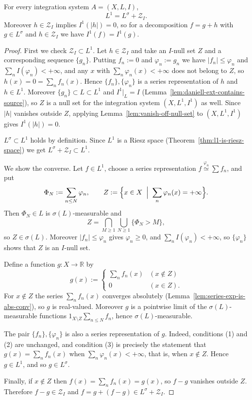 \begin{proposition}\label{prop:l1-decomposition}
  For every integration system $A=(X,L,I)$,
  \[
    L^1=L^{\sigma}+\mathcal{Z}_I .
  \]
  Moreover $h\in\mathcal{Z}_I$ implies $I^1(|h|)=0$, so for a decomposition
  $f=g+h$ with $g\in L^{\sigma}$ and $h\in\mathcal{Z}_I$ we have
  $I^1(f)=I^1(g)$.
\end{proposition}
\begin{proof}
  First we check $\mathcal{Z}_I\subset L^1$.
  Let $h\in\mathcal{Z}_I$ and take an $I$-null set $Z$ and a corresponding
  sequence $\{g_n\}$.
  Putting $f_n:=0$ and $\varphi_n:=g_n$ we have $|f_n|\le\varphi_n$ and
  $\sum_nI(\varphi_n)<+\infty$, and any $x$ with $\sum_n\varphi_n(x)<+\infty$
  does not belong to $Z$, so $h(x)=0=\sum_nf_n(x)$.
  Hence $\{f_n\},\{\varphi_n\}$ is a series representation of $h$ and
  $h\in L^1$.
  Moreover $\{g_n\}\subset L\subset L^1$ and $I^1|_L=I$
  (Lemma~\ref{lem:daniell-ext-contains-source}), so $Z$ is a null set for the
  integration system $(X,L^1,I^1)$ as well.
  Since $|h|$ vanishes outside $Z$, applying
  Lemma~\ref{lem:vanish-off-null-set} to $(X,L^1,I^1)$ gives $I^1(|h|)=0$.

  $L^{\sigma}\subset L^1$ holds by definition. Since $L^1$ is a Riesz space
  (Theorem~\ref{thm:l1-is-riesz-space}) we get
  $L^{\sigma}+\mathcal{Z}_I\subset L^1$.

  We show the converse. Let $f\in L^1$, choose a series representation
  $f\overset{\varphi_n}{\simeq}\sum f_n$, and put
  \[
    \Phi_N:=\sum_{n\le N}\varphi_n,
    \qquad
    Z:=\Bigl\{x\in X\;\Bigm|\;\sum_n\varphi_n(x)=+\infty\Bigr\} .
  \]
  Then $\Phi_N\in L$ is $\sigma(L)$-measurable and
  \[
    Z=\bigcap_{M\ge1}\bigcup_{N\ge1}\{\Phi_N>M\} ,
  \]
  so $Z\in\sigma(L)$.
  Moreover $|f_n|\le\varphi_n$ gives $\varphi_n\ge0$, and
  $\sum_nI(\varphi_n)<+\infty$, so $\{\varphi_n\}$ shows that $Z$ is an $I$-null
  set.

  Define a function $g:X\to\mathbb{R}$ by
  \[
    g(x):=
    \begin{cases}
      \sum_nf_n(x) & (x\notin Z)\\
      0 & (x\in Z).
    \end{cases}
  \]
  For $x\notin Z$ the series $\sum_nf_n(x)$ converges absolutely
  (Lemma~\ref{lem:series-exp-is-abs-conv}), so $g$ is real-valued.
  Moreover $g$ is a pointwise limit of the $\sigma(L)$-measurable functions
  $1_{X\setminus Z}\sum_{n\le N}f_n$, hence $\sigma(L)$-measurable.

  The pair $\{f_n\},\{\varphi_n\}$ is also a series representation of $g$.
  Indeed, conditions (1) and (2) are unchanged, and condition (3) is precisely
  the statement that $g(x)=\sum_nf_n(x)$ when
  $\sum_n\varphi_n(x)<+\infty$, that is, when $x\notin Z$.
  Hence $g\in L^1$, and so $g\in L^{\sigma}$.

  Finally, if $x\notin Z$ then $f(x)=\sum_nf_n(x)=g(x)$, so $f-g$ vanishes
  outside $Z$. Therefore $f-g\in\mathcal{Z}_I$ and
  $f=g+(f-g)\in L^{\sigma}+\mathcal{Z}_I$.
\end{proof}

